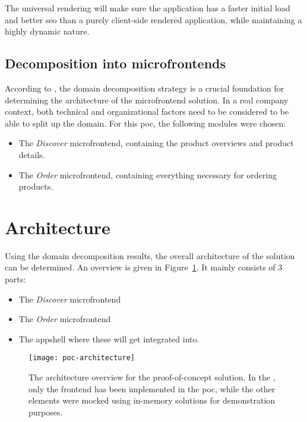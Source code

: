 The universal rendering will make sure the application has a faster initial load
and better \gls{seo} than a purely client-side rendered application, while
maintaining a highly dynamic nature.

\subsection{Decomposition into microfrontends}

According to \textcite{Rappl_2021}, the domain decomposition strategy is a
crucial foundation for determining the architecture of the \gls{microfrontend}
solution. In a real company context, both technical and organizational factors
need to be considered to be able to split up the domain. For this \gls{poc}, the
following modules were chosen:

\begin{itemize}
  \item The \textit{Discover} \gls{microfrontend}, containing the product
  overviews and product details.
  \item The \textit{Order} \gls{microfrontend}, containing everything necessary
  for ordering products.
\end{itemize}

\section{Architecture}

Using the domain decomposition results, the overall architecture of the solution
can be determined. An overview is given in Figure~\ref{fig:poc-architecture}. It
mainly consists of 3 parts:
\begin{itemize}
  \item The \textit{Discover} \gls{microfrontend}
  \item The \textit{Order} \gls{microfrontend}
  \item The \gls{appshell} where these  will
  get integrated into.
\end{itemize}
 

\begin{figure}
  \centering
  \texttt{[image: poc-architecture]}
  \caption[Architecture overview for proof-of-concept solution]{The architecture
  overview for the proof-of-concept solution. In the ,
  only the \gls{frontend} has been implemented in the \gls{poc}, while the other
  elements were mocked using in-memory solutions for demonstration purposes.  
  }
  \label{fig:poc-architecture}
\end{figure}

